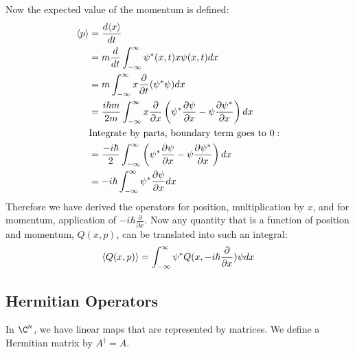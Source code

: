 \documentclass[../Main.tex]{subfiles}
\begin{document}
Now the expected value of the momentum is defined:
\begin{align*}
    \langle p \rangle &= \frac{d\langle x \rangle}{dt} \\
    &= m \frac{d}{dt} \int_{-\infty}^{\infty} \psi^*(x, t) x \psi(x, t) dx \\
    &= m \int_{-\infty}^{\infty} x \frac{\partial}{\partial t}(\psi^* \psi) dx \\
    &= \frac{i\hbar m}{2m} \int_{-\infty}^{\infty} x \frac{\partial}{\partial x}\left(\psi^* \frac{\partial \psi}{\partial x}- \psi \frac{\partial \psi^*}{\partial x}\right) dx \\
    &\text{Integrate by parts, boundary term goes to }0: \\
    &= \frac{-i\hbar}{2} \int_{-\infty}^{\infty} \left(\psi^* \frac{\partial \psi}{\partial x} - \psi \frac{\partial \psi^*}{\partial x}\right) dx \\
    &= -i\hbar \int_{-\infty}^{\infty} \psi^* \frac{\partial \psi}{\partial x} dx \\
\end{align*}
Therefore we have derived the operators for position, multiplication by $x$, and for momentum, application of $-i\hbar \frac{\partial}{\partial x}$. Now any quantity that is a function of position and momentum, $Q(x, p)$, can be translated into such an integral:
\begin{equation*}
    \langle Q(x, p) \rangle = \int_{-\infty}^{\infty} \psi^* Q(x, -i\hbar \frac{\partial}{\partial x})\psi dx 
\end{equation*}
\subsection{Hermitian Operators}
In $\C^n$, we have linear maps that are represented by matrices. We define a Hermitian matrix by $A^\dagger = A$.
\end{document}

